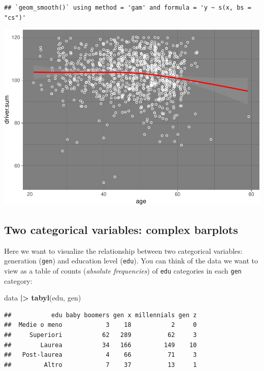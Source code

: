 \documentclass[
]{book}
\newenvironment{Shaded}{\begin{snugshade}}{\end{snugshade}}
\newcommand{\FunctionTok}[1]{\textcolor[rgb]{0.13,0.29,0.53}{\textbf{#1}}}
\newcommand{\NormalTok}[1]{#1}
\newcommand{\SpecialCharTok}[1]{\textcolor[rgb]{0.81,0.36,0.00}{\textbf{#1}}}
\begin{document}
\begin{verbatim}
## `geom_smooth()` using method = 'gam' and formula = 'y ~ s(x, bs = "cs")'
\end{verbatim}

\includegraphics{R-for-social-research-and-business-analytics_files/figure-latex/unnamed-chunk-33-1.pdf}

\hypertarget{two-categorical-variables-complex-barplots}{%
\subsection{Two categorical variables: complex barplots}\label{two-categorical-variables-complex-barplots}}

Here we want to visualize the relationship between two categorical variables: generation (\texttt{gen}) and education level (\texttt{edu}). You can think of the data we want to view as a table of counts (\emph{absolute frequencies}) of \texttt{edu} categories in each \texttt{gen} category:

\begin{Shaded}
\begin{Highlighting}[]
\NormalTok{data }\SpecialCharTok{|\textgreater{}} 
  \FunctionTok{tabyl}\NormalTok{(edu, gen) }
\end{Highlighting}
\end{Shaded}

\begin{verbatim}
##           edu baby boomers gen x millennials gen z
##  Medie o meno            3    18           2     0
##     Superiori           62   289          62     3
##        Laurea           34   166         149    10
##   Post-laurea            4    66          71     3
##         Altro            7    37          13     1
\end{verbatim}
\end{document}
